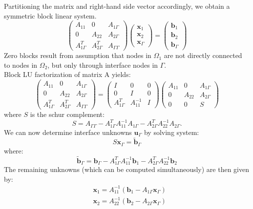 \documentclass[11pt]{book}
\begin{document}
Partitioning the matrix and right-hand side vector accordingly, we obtain a symmetric block linear system. 
$$
\left(\begin{array}{ccc}
A_{11} & 0 & A_{1 \Gamma} \\
0 & A_{22} & A_{2 \Gamma} \\
A_{1 \Gamma}^{T} & A_{2 \Gamma}^{T} & A_{\Gamma \Gamma}
\end{array}\right)\left(\begin{array}{l}
\mathbf{x}_{1} \\
\mathbf{x}_{2} \\
\mathbf{x}_{\Gamma}
\end{array}\right)=\left(\begin{array}{l}
\mathbf{b}_{1} \\
\mathbf{b}_{2} \\
\mathbf{b}_{\Gamma}
\end{array}\right)
$$
Zero blocks result from assumption that nodes in $\Omega_{1}$ are not directly connected to nodes in $\Omega_{2}$, but only through interface nodes in $\Gamma$. \\
Block LU factorization of matrix A yields:
$$
\left(\begin{array}{ccc}
A_{11} & 0 & A_{1 \Gamma} \\
0 & A_{22} & A_{2 \Gamma} \\
A_{1 \Gamma}^{T} & A_{2 \Gamma}^{T} & A_{\Gamma \Gamma}
\end{array}\right)=\left(\begin{array}{ccc}
I & 0 & 0 \\
0 & I & 0 \\
A_{1 \Gamma}^{T} & A_{11}^{-1} & I
\end{array}\right)\left(\begin{array}{ccc}
A_{11} & 0 & A_{1 \Gamma} \\
0 & A_{22} & A_{2 \Gamma} \\
0 & 0 & S
\end{array}\right)
$$
where $S$ is the schur complement:
$$
S=A_{\Gamma \Gamma}-A_{1 \Gamma}^{T} A_{11}^{-1} A_{1 \Gamma}-A_{2 \Gamma}^{T} A_{22}^{-1} A_{2 \Gamma}.
$$
We can now determine interface unknowns $\mathbf{u}_{\Gamma}$ by solving system:
$$
S \mathbf{x}_{\Gamma}=\widetilde{\mathbf{b}}_{\Gamma}
$$
where:
$$
\widetilde{\mathbf{b}}_{\Gamma}=\mathbf{b}_{\Gamma}-A_{1 \Gamma}^{T} A_{11}^{-1} \mathbf{b}_{1}-A_{2 \Gamma}^{T} A_{22}^{-1} \mathbf{b}_{2}
$$
The remaining unknowns (which can be computed simultaneously) are then given by:
$$
\begin{aligned}
& \mathbf{x}_{1}=A_{11}^{-1}\left(\mathbf{b}_{1}-A_{1 \Gamma} \mathbf{x}_{\Gamma}\right) \\
& \mathbf{x}_{2}=A_{22}^{-1}\left(\mathbf{b}_{2}-A_{2 \Gamma} \mathbf{x}_{\Gamma}\right)
\end{aligned}
$$
\end{document}
